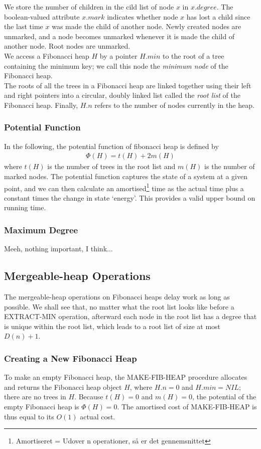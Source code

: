 \documentclass[12pt]{article}
\begin{document}
We store the number of children in the cild list of node $x$ in $x.degree$. The boolean-valued attribute $x.mark$ indicates whether node $x$ has lost a child since the last time $x$ was made the child of another node. Newly created nodes are unmarked, and a node becomes unmarked whenever it is made the child of another node. Root nodes are unmarked.\\

We access a Fibonacci heap $H$ by a pointer $H.min$ to the root of a tree containing the minimum key; we call this node the \textit{minimum node} of the Fibonacci heap.\\

The roots of all the trees in a Fibonacci heap are linked together using their left and right pointers into a circular, doubly linked list called the \textit{root list} of the Fibonacci heap. Finally, $H.n$ refers to the number of nodes currently in the heap.
%
\subsubsection{Potential Function}
In the following, the potential function of fibonacci heap is defined by
\begin{align}
	\Phi(H) = t(H) + 2m(H)
\end{align}
where $t(H)$ is the number of trees in the root list and $m(H)$ is the number of marked nodes. The potential function captures the state of a system at a given point, and we can then calculate an amortised\footnote{Amortiseret = Udover n operationer, så er det gennemsnittet} time as the actual time plus a constant times the change in state ‘energy’. This provides a valid upper bound on running time.

\subsubsection{Maximum Degree}
Meeh, nothing important, I think... 

\subsection{Mergeable-heap Operations}
The mergeable-heap operations on Fibonacci heaps delay work as long as possible. We shall see that, no matter what the root list looks like before a EXTRACT-MIN operation, afterward each node in the root list has a degree that is unique within the root list, which leads to a root list of size at most $D(n) + 1$. 
%
\subsubsection{Creating a New Fibonacci Heap}
To make an empty Fibonacci heap, the MAKE-FIB-HEAP procedure allocates and returns the Fibonacci heap object $H$, where $H.n = 0$ and $H.min = NIL$; there are no trees in $H$. Because $t(H) = 0$ and $m(H) = 0$, the potential of the empty Fibonacci heap is $\Phi(H) = 0$. The amortised cost of MAKE-FIB-HEAP is thus equal to its $O(1)$ actual cost.
%
\end{document}
